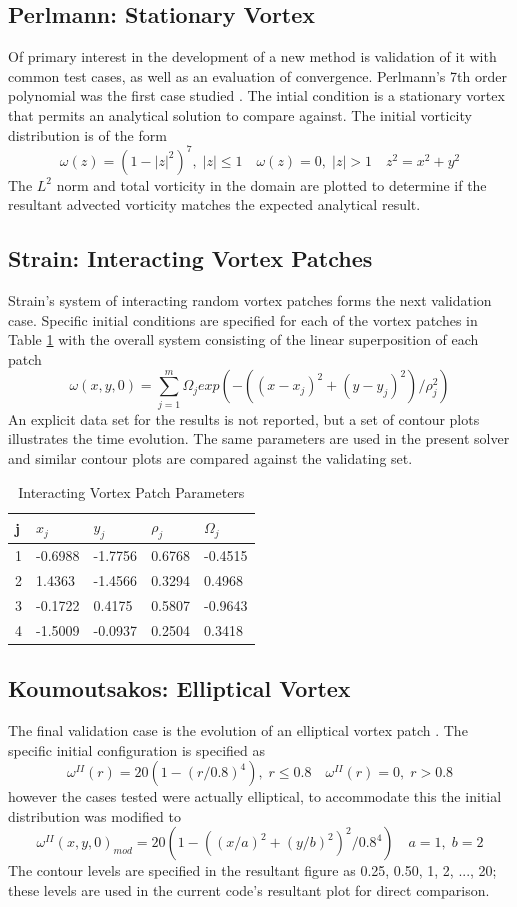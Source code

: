 \documentclass[letterpaper,12pt]{report}
\newcommand{\be}{\begin{equation}}
\newcommand{\ee}{\end{equation}}
\begin{document}
\subsection{Perlmann: Stationary Vortex}
Of primary interest in the development of a new method is validation of it with common test cases, as well as an evaluation of convergence. Perlmann's 7th order polynomial was the first case studied \cite{Perlmann1985}. The intial condition is a stationary vortex that permits an analytical solution to compare against. The initial vorticity distribution is of the form
\be \omega(z)=(1-|z|^2)^7, \; |z|\leq 1  \quad \omega(z)=0, \;|z|>1 \quad z^2=x^2+y^2 \ee
The $L^2$ norm and total vorticity in the domain are plotted to determine if the resultant advected vorticity matches the expected analytical result.

\subsection{Strain: Interacting Vortex Patches}
Strain's system of interacting random vortex patches \cite{Strain1996} forms the next validation case. Specific initial conditions are specified for each of the vortex patches in Table \ref{table:StrainTable} with the overall system consisting of the linear superposition of each patch
\be \omega(x,y,0) = \sum_{j=1}^m \Omega_j exp(-((x-x_j)^2 + (y-y_j)^2)/\rho_j^2) \ee
An explicit data set for the results is not reported, but a set of contour plots illustrates the time evolution. The same parameters are used in the present solver and similar contour plots are compared against the validating set.

\begin{table}
\centering
\caption{Interacting Vortex Patch Parameters}\label{table:StrainTable}
\begin{tabular}{lllll}
\hline
j & $x_j$    & $y_j$    & $\rho_j$ & $\Omega_j$ \\ \hline
1 & -0.6988 & -1.7756 & 0.6768  & -0.4515   \\
2 & 1.4363  & -1.4566 & 0.3294  & 0.4968    \\
3 & -0.1722 & 0.4175  & 0.5807  & -0.9643   \\
4 & -1.5009 & -0.0937 & 0.2504  &  0.3418    \\ \hline
\end{tabular}
\end{table}

\subsection{Koumoutsakos: Elliptical Vortex}
The final validation case is the evolution of an elliptical vortex patch \cite{Koum1997}. The specific initial configuration is specified as
\be \omega^{II}(r) = 20(1-(r/0.8)^4), \; r\leq 0.8 \quad \omega^{II}(r)=0, \; r>0.8 \ee
however the cases tested were actually elliptical, to accommodate this the initial distribution was modified to
\be \omega^{II}(x,y,0)_{mod} = 20(1-((x/a)^2+(y/b)^2)^2/0.8^4 ) \quad a=1, \; b=2 \ee
The contour levels are specified in the resultant figure as 0.25, 0.50, 1, 2, ..., 20; these levels are used in the current code's resultant plot for direct comparison.
\end{document}
